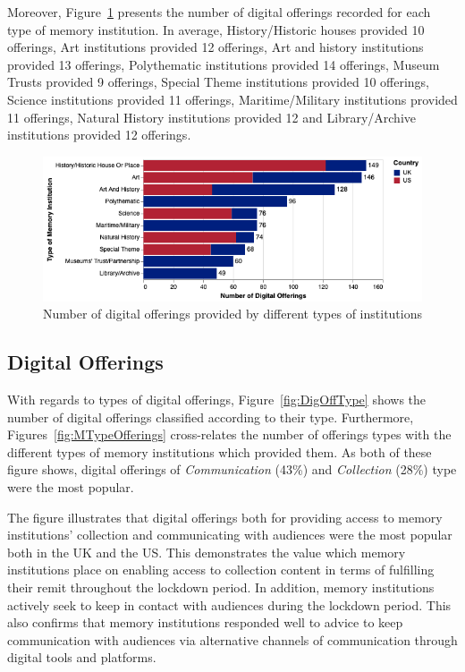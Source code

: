 \documentclass{egpubl}
\begin{document}
Moreover, Figure~\ref{fig:typeofferings} presents the number of digital offerings recorded for each type of memory institution. In average, History/Historic houses provided 10 offerings, Art institutions provided 12 offerings, Art and history institutions provided 13 offerings, Polythematic institutions provided 14 offerings, Museum Trusts provided 9 offerings, Special Theme institutions provided 10 offerings, Science institutions provided 11 offerings, Maritime/Military institutions provided 11 offerings, Natural History institutions provided 12 and Library/Archive institutions provided 12 offerings. 

\begin{figure}[h]
  \centering
  \includegraphics[width=\linewidth]{images/typesoffering.png}
  \caption{\label{fig:typeofferings}
           Number of digital offerings provided by different types of institutions}
\end{figure}




\subsection{Digital Offerings}
With regards to types of digital offerings, Figure~\ref{fig:DigOffType} shows the number of digital offerings classified according to their type. Furthermore, Figures~\ref{fig:MTypeOfferings} cross-relates the number of offerings types with the different types of memory institutions which provided them. As both of these figure shows, digital offerings of \emph{Communication} (43\%) and \emph{Collection} (28\%) type were the most popular. 

The figure illustrates that digital offerings both for providing access to memory institutions' collection and communicating with audiences were the most popular both in the UK and the US. This demonstrates the value which memory institutions place on enabling access to collection content in terms of fulfilling their remit throughout the lockdown period. In addition, memory institutions actively seek to keep in contact with audiences during the lockdown period. This also confirms that memory institutions responded well to advice to keep communication with audiences via alternative channels of communication through digital tools and platforms. 
\end{document}
